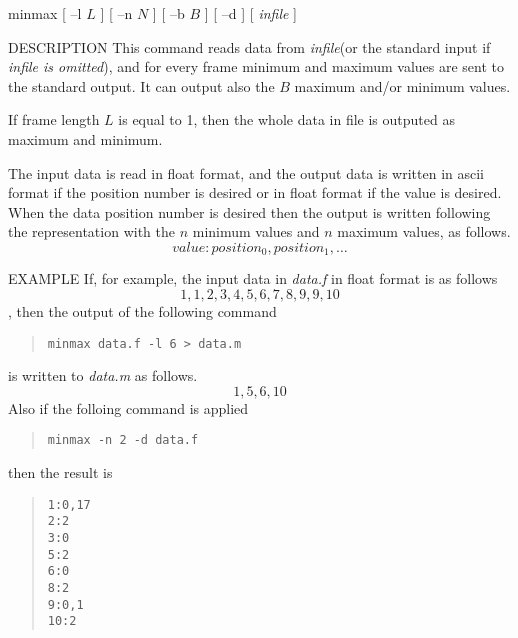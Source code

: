 
\begin{synopsis}
 \item [minmax] [ --l $L$ ] [ --n $N$ ] [ --b $B$ ] [ --d ] [ {\em infile} ]
\end{synopsis}

\begin{qsection}{DESCRIPTION}
This command reads data from {\em infile}(or the standard input if
{\em infile is omitted}), and for every frame minimum and maximum
values are sent to the standard output.
It can output also the $B$ maximum and/or minimum values.

If frame length $L$ is equal to 1, then the whole data in file
is outputed as maximum and minimum.

The input data is read in float format,
and the output data is written in ascii format
if the position number is desired or in float format
if the value is desired.
When the data position number is desired then
the output is written following the representation 
with the $n$ minimum values and
$n$ maximum values, as follows.
\begin{displaymath}
value:position_0,position_1,\ldots
\end{displaymath}
\end{qsection}

\begin{options}
\end{options}

\begin{qsection}{EXAMPLE}
If, for example, the input data in {\em data.f} in float format
is as follows
\[1,1,2,3,4,5,6,7,8,9,9,10\],
then the output of the following command
\begin{quote}
 \verb!minmax data.f -l 6 > data.m!
\end{quote}
is written to {\em data.m} as follows.
\[1,5,6,10\]
Also if the folloing command is applied
\begin{quote}
 \verb!minmax -n 2 -d data.f!
\end{quote}
then the result is 
\begin{quote}
 \verb!1:0,17!\\
 \verb!2:2!\\
 \verb!3:0!\\
 \verb!5:2!\\
 \verb!6:0!\\
 \verb!8:2!\\
 \verb!9:0,1!\\
 \verb!10:2!
\end{quote}
\end{qsection}
